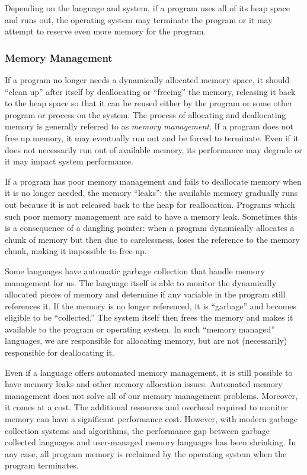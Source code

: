 Depending on the language and system, if a program uses all of its 
heap space and runs out, the operating system may terminate the program or it 
may attempt to reserve even more memory for the program.

\subsubsection{Memory Management}

If a program no longer needs a dynamically allocated memory space, 
it should ``clean up'' after itself by deallocating or ``freeing'' the memory, 
releasing it back to the heap space so that it can be reused either by 
the program or some other program or process on the system.
The process of allocating and deallocating memory is generally
referred to as \emph{memory management}.  If a program does not
free up memory, it may eventually run out and be forced to terminate.  
Even if it does not necessarily run out of available memory, its 
performance may degrade or it may impact system performance. 

If a program has poor memory management and fails to deallocate
memory when it is no longer needed, the memory ``leaks'': the available
memory gradually runs out because it is not released back to the 
heap for reallocation.  Programs which such poor memory management
are said to have a \gls{memory leak}. Sometimes
this is a consequence of a \gls{dangling pointer}: when a program
dynamically allocates a chunk of memory but then due to carelessness,
loses the reference to the memory chunk, making it impossible
to free up.

Some languages have automatic 
\gls{garbage collection} that
handle memory management for us.  The language itself is
able to monitor the dynamically allocated pieces of memory 
and determine if any variable in the program still references it.
If the memory is no longer referenced, it is ``garbage'' and
becomes eligible to be ``collected.''  The system itself then
frees the memory and makes it available to the program or
operating system.  In such ``memory managed'' languages, 
we are responsible for allocating memory, but are not (necessarily)
responsible for deallocating it.  

Even if a language offers automated memory management, 
it is still possible to have memory leaks and other memory
allocation issues.  Automated memory management
does not solve all of our memory management problems.  
Moreover, it comes at a cost.  The additional resources and
overhead required to monitor memory can have a significant
performance cost.  However, with modern garbage collection
systems and algorithms, the performance gap between
garbage collected languages and user-managed memory
languages has been shrinking. In any case, all program memory 
is reclaimed by 
the operating system when the program terminates.

